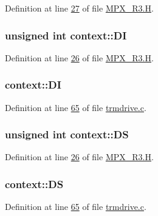 Definition at line \hyperlink{_m_p_x___r3_8_h_source_l00027}{27} of file \hyperlink{_m_p_x___r3_8_h_source}{MPX\_\-R3.H}.

\hypertarget{structcontext_a71fd72ac821b4c932ad6f5befd4a5ea4}{
\subsubsection[{DI}]{\setlength{\rightskip}{0pt plus 5cm}unsigned int {\bf context::DI}}}
\label{structcontext_a71fd72ac821b4c932ad6f5befd4a5ea4}


Definition at line \hyperlink{_m_p_x___r3_8_h_source_l00026}{26} of file \hyperlink{_m_p_x___r3_8_h_source}{MPX\_\-R3.H}.

\hypertarget{structcontext_ac4670fc443363dcb63982933e6f56858}{
\subsubsection[{DI}]{ {\bf context::DI}}}
\label{structcontext_ac4670fc443363dcb63982933e6f56858}


Definition at line \hyperlink{trmdrive_8c_source_l00065}{65} of file \hyperlink{trmdrive_8c_source}{trmdrive.c}.

\hypertarget{structcontext_a657e73663a4443be61a078d31c28ee3e}{
\subsubsection[{DS}]{\setlength{\rightskip}{0pt plus 5cm}unsigned int {\bf context::DS}}}
\label{structcontext_a657e73663a4443be61a078d31c28ee3e}


Definition at line \hyperlink{_m_p_x___r3_8_h_source_l00026}{26} of file \hyperlink{_m_p_x___r3_8_h_source}{MPX\_\-R3.H}.

\hypertarget{structcontext_ad2a3e611b78532bc1accf02c848b7599}{
\subsubsection[{DS}]{ {\bf context::DS}}}
\label{structcontext_ad2a3e611b78532bc1accf02c848b7599}


Definition at line \hyperlink{trmdrive_8c_source_l00065}{65} of file \hyperlink{trmdrive_8c_source}{trmdrive.c}.

